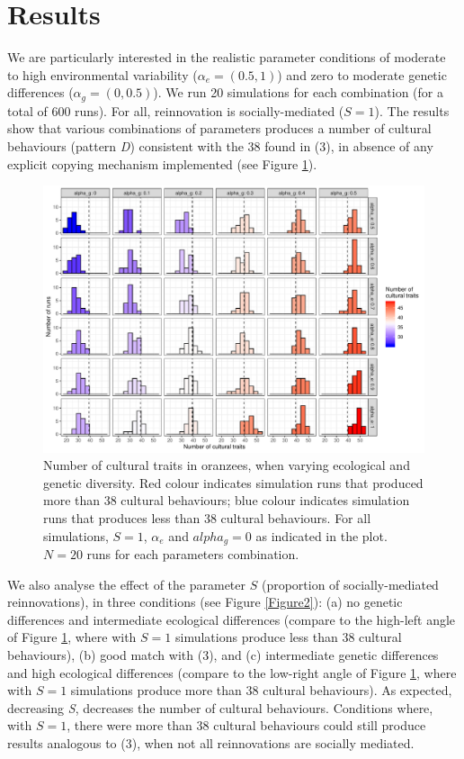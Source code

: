 \documentclass[9pt,twocolumn,twoside,]{pnas-new}
\begin{document}
\section*{Results}\label{results}

We are particularly interested in the realistic parameter conditions of
moderate to high environmental variability (\(\alpha_e=(0.5,1)\)) and
zero to moderate genetic differences (\(\alpha_g=(0,0.5)\)). We run 20
simulations for each combination (for a total of 600 runs). For all,
reinnovation is socially-mediated (\(S=1\)). The results show that
various combinations of parameters produces a number of cultural
behaviours (pattern \emph{D}) consistent with the 38 found in (3), in
absence of any explicit copying mechanism implemented (see Figure
\ref{Figure1}).

\begin{figure}[h!]
\begin{center}
\includegraphics[width=17.8cm]{figures/figure_1.pdf}
\caption{Number of cultural traits in oranzees, when varying ecological and genetic diversity. Red colour indicates simulation runs that produced more than 38 cultural behaviours; blue colour indicates simulation runs that produces less than 38 cultural behaviours. For all simulations, $S=1$, $\alpha_e$ and $alpha_g=0$ as indicated in the plot. $N=20$ runs for each parameters combination.}
\label{Figure1}
\end{center}
\end{figure}

We also analyse the effect of the parameter \(S\) (proportion of
socially-mediated reinnovations), in three conditions (see Figure
\ref{Figure2}): (a) no genetic differences and intermediate ecological
differences (compare to the high-left angle of Figure \ref{Figure1},
where with \(S=1\) simulations produce less than 38 cultural
behaviours), (b) good match with (3), and (c) intermediate genetic
differences and high ecological differences (compare to the low-right
angle of Figure \ref{Figure1}, where with \(S=1\) simulations produce
more than 38 cultural behaviours). As expected, decreasing \emph{S},
decreases the number of cultural behaviours. Conditions where, with
\(S=1\), there were more than 38 cultural behaviours could still produce
results analogous to (3), when not all reinnovations are socially
mediated.
\end{document}
